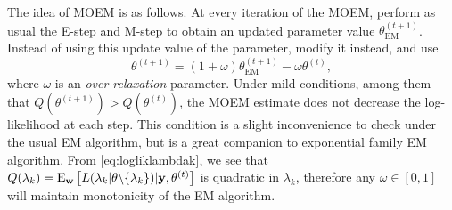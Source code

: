 The idea of MOEM is as follows.
At every iteration of the MOEM, perform as usual the E-step and M-step to obtain an updated parameter value $\theta^{(t+1)}_\text{EM}$.
Instead of using this update value of the parameter, modify it instead, and use
\[
  \theta^{(t+1)} = (1 + \omega) \theta^{(t+1)}_\text{EM} - \omega \theta^{(t)},
\]
where $\omega$ is an \emph{over-relaxation} parameter.
Under mild conditions, among them that $Q(\theta^{(t+1)}) > Q(\theta^{(t)})$, the MOEM estimate does not decrease the log-likelihood at each step.
This condition is a slight inconvenience to check under the usual EM algorithm, but is a great companion to exponential family EM algorithm.
From \cref{eq:logliklambdak}, we see that $Q(\lambda_k) = \operatorname{E}_{\mathbf w} \big[ L(\lambda_k|\theta\backslash\{\lambda_k \} ) | {\mathbf y},\theta^{(t)} \big]$ is quadratic in $\lambda_k$, therefore any $\omega \in [0,1]$ will maintain monotonicity of the EM algorithm.

